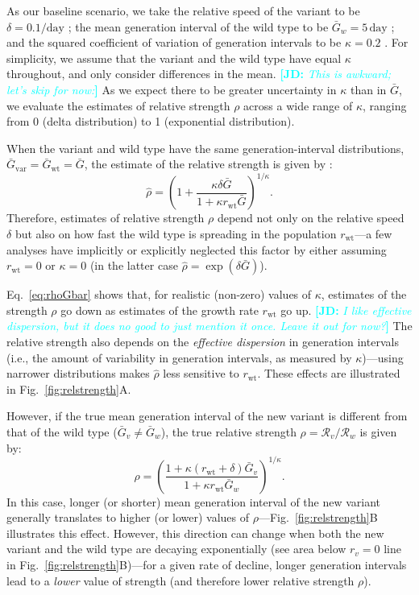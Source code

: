 \documentclass[12pt]{article}
\newcommand{\comment}{\showcomment}
\newcommand{\showcomment}[3]{\textcolor{#1}{\textbf{[#2: }\textsl{#3}\textbf{]}}}
\newcommand{\jd}[1]{\comment{cyan}{JD}{#1}}
\newcommand{\eref}[1]{Eq.~\ref{eq:#1}}
\newcommand{\fref}[1]{Fig.~\ref{fig:#1}}
\newcommand{\rx}[1]{\ensuremath{{r}_{#1}}\xspace}
\newcommand{\ry}[1]{\rx{\mathrm{#1}}}
\newcommand{\rw}{\ry{wt}}
\newcommand{\RR}{\ensuremath{{\mathcal R}}\xspace}
\newcommand{\days}{\ensuremath{\, \textrm{day}}}
\newcommand{\Gx}[1]{\ensuremath{{\bar G}_{#1}}\xspace}
\newcommand{\Gy}[1]{\Gx{\mathrm{#1}}}
\begin{document}
As our baseline scenario, we take the relative speed of the variant to be $\delta = 0.1/\textrm{day}$ \citep{davies2021estimated}; the mean generation interval of the wild type to be $\bar{G}_w = 5\days$ \citep{ferretti2020quantifying}; and the squared coefficient of variation of generation intervals to be $\kappa=0.2$ \citep{ferretti2020quantifying}.
For simplicity, we assume that the variant and the wild type have equal $\kappa$ throughout, and only consider differences in the mean.
\jd{This is awkward; let's skip for now:} As we expect there to be greater uncertainty in $\kappa$ than in $\bar{G}$, we evaluate the estimates of relative strength $\rho$ across a wide range of $\kappa$, ranging from 0 (delta distribution) to 1 (exponential distribution).

When the variant and wild type have the same generation-interval distributions, $\Gy{var} = \Gy{wt} = \bar{G}$, 
the estimate of the relative strength is given by \citep{park2019practical}:
\begin{equation}
\hat{\rho} = \left(1 + \frac{\kappa \delta \bar{G}}{1 + \kappa \ry{wt} \bar{G}}\right)^{1/\kappa}.
\label{eq:rhoGbar}
\end{equation}
Therefore, estimates of relative strength $\rho$ depend not only on the relative speed $\delta$ but also on how fast the wild type is spreading in the population \rw---a few analyses have implicitly or explicitly neglected this factor by either assuming $\rw = 0$ \citep{switzerland2021variant} or $\kappa = 0$ \citep{davies2021estimated} (in the latter case $\hat{\rho} = \exp(\delta \bar{G})$).

\eref{rhoGbar} shows that, for realistic (non-zero) values of $\kappa$, estimates of the strength $\rho$ go down as estimates of the growth rate $\rw$ go up. 
\jd{I like effective dispersion, but it does no good to just mention it once. Leave it out for now?}
The relative strength also depends on the \emph{effective dispersion} in generation intervals (i.e., the amount of variability in generation intervals, as measured by $\kappa$)---using narrower distributions makes $\hat{\rho}$ less sensitive to $\ry{wt}$.
These effects are illustrated in \fref{relstrength}A.

However, if the true mean generation interval of the new variant is different from that of the wild type ($\bar{G}_v \neq \bar{G}_w$), the true relative strength $\rho = \RR_v/\RR_w$ is given by:
\begin{equation}
\rho = \left(\frac{1 + \kappa (\rw + \delta) \bar{G}_v}{1 + \kappa \rw \bar{G}_w}\right)^{1/\kappa}.
\end{equation}
In this case, longer (or shorter) mean generation interval of the new variant generally translates to higher (or lower) values of $\rho$---\fref{relstrength}B illustrates this effect.
However, this direction can change when both the new variant and the wild type are decaying exponentially (see area below $r_v = 0$ line in \fref{relstrength}B)---for a given rate of decline, longer generation intervals lead to a \emph{lower} value of strength (and therefore lower relative strength $\rho$).
\end{document}

